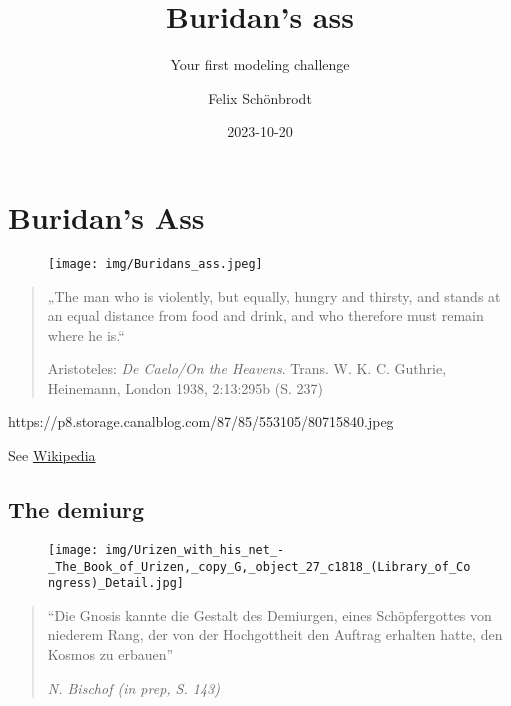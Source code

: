 \documentclass[
  letterpaper,
  DIV=11,
  numbers=noendperiod]{scrartcl}
\title{Buridan's ass}
\subtitle{Your first modeling challenge}
\author{Felix Schönbrodt}
\date{2023-10-20}
\begin{document}
\maketitle
\ifdefined\Shaded\renewenvironment{Shaded}{\begin{tcolorbox}[borderline west={3pt}{0pt}{shadecolor}, boxrule=0pt, frame hidden, sharp corners, interior hidden, enhanced, breakable]}{\end{tcolorbox}}\fi

\hypertarget{buridans-ass}{%
\section{Buridan's Ass}\label{buridans-ass}}

\begin{figure}

{\centering \texttt{[image: img/Buridans\_ass.jpeg]}

}

\end{figure}

\begin{quote}
„The man who is violently, but equally, hungry and thirsty, and stands
at an equal distance from food and drink, and who therefore must remain
where he is.``

Aristoteles: \emph{De Caelo/On the Heavens}. Trans. W. K. C. Guthrie,
Heinemann, London 1938, 2:13:295b (S. 237)
\end{quote}

https://p8.storage.canalblog.com/87/85/553105/80715840.jpeg

See \href{https://de.wikipedia.org/wiki/Buridans_Esel}{Wikipedia}

\hypertarget{the-demiurg}{%
\subsection{The demiurg}\label{the-demiurg}}

\begin{figure}

{\centering \texttt{[image: img/Urizen\_with\_his\_net\_-\_The\_Book\_of\_Urizen,\_copy\_G,\_object\_27\_c1818\_(Library\_of\_Congress)\_Detail.jpg]}

}

\end{figure}

\begin{quote}
``Die Gnosis kannte die Gestalt des Demiurgen, eines Schöpfergottes von
niederem Rang, der von der Hochgottheit den Auftrag erhalten hatte, den
Kosmos zu erbauen''

\emph{N. Bischof (in prep, S. 143)}
\end{quote}
\end{document}
